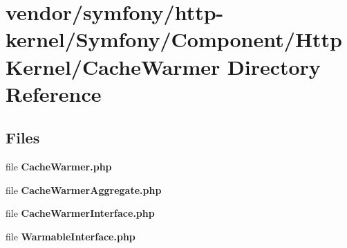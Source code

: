 \section{vendor/symfony/http-\/kernel/\+Symfony/\+Component/\+Http\+Kernel/\+Cache\+Warmer Directory Reference}
\label{dir_f103cbe815a564d637744ec14d6faa8f}
\subsection*{Files}
\begin{DoxyCompactItemize}
\item 
file {\bf Cache\+Warmer.\+php}
\item 
file {\bf Cache\+Warmer\+Aggregate.\+php}
\item 
file {\bf Cache\+Warmer\+Interface.\+php}
\item 
file {\bf Warmable\+Interface.\+php}
\end{DoxyCompactItemize}
